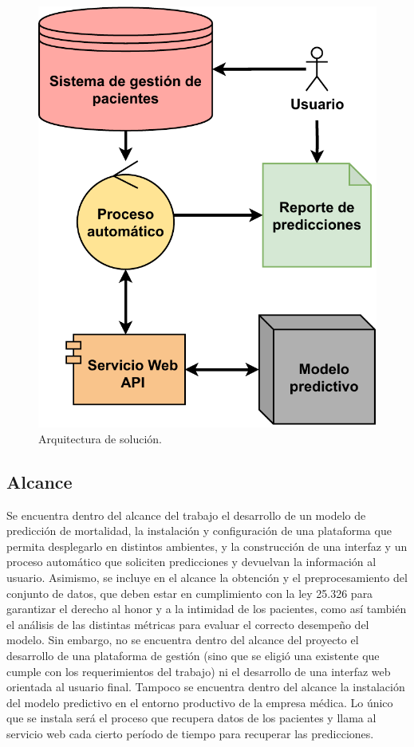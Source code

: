 \begin{figure}[htpb]
\centering 
\includegraphics[width=.50\textwidth]{./Figures/Arquiectura_Solucion_Basica.pdf}
\caption{Arquitectura de solución.}
\label{fig:diagArqBasic}
\end{figure}


\subsection{Alcance}

Se encuentra dentro del alcance del trabajo el desarrollo de un modelo de predicción de mortalidad, la instalación y configuración de una plataforma que permita desplegarlo en distintos ambientes, y la construcción de una interfaz y un proceso automático que soliciten predicciones y devuelvan la información al usuario.
Asimismo, se incluye en el alcance la obtención y el preprocesamiento del conjunto de datos, que deben estar en cumplimiento con la ley 25.326 para garantizar el derecho al honor y a la intimidad de los pacientes, como así también el análisis de las distintas métricas para evaluar el correcto desempeño del modelo.
Sin embargo, no se encuentra dentro del alcance del proyecto el desarrollo de una plataforma de gestión (sino que se eligió una existente que cumple con los requerimientos del trabajo) ni el desarrollo de una interfaz web orientada al usuario final. Tampoco se encuentra dentro del alcance la instalación del modelo predictivo en el entorno productivo de la empresa médica. Lo único que se instala será el proceso que recupera datos de los pacientes y llama al servicio web cada cierto período de tiempo para recuperar las predicciones. 

